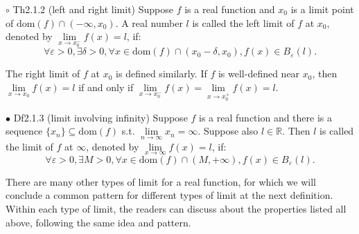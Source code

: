 \documentclass{article}
\begin{document}
\begin{Df}{$\circ$ Th2.1.2 (left and right limit)}
    Suppose $f$ is a real function and $x_0$ is a limit point of $\text{dom}(f)\cap (-\infty, x_0)$. A real number $l$ is called the left limit of $f$ at $x_0$, denoted by $\lim\limits_{x\rightarrow x_0^-}f(x) = l$, if:
    $$\forall\varepsilon>0, \exists\delta>0, \forall x\in\text{dom}(f)\cap(x_0-\delta, x_0), f(x)\in B_\varepsilon(l).$$
\end{Df}

\begin{Rmk}{}
    The right limit of $f$ at $x_0$ is defined similarly. \textcolor{Th}{If $f$ is well-defined near $x_0$, then $\lim\limits_{x\rightarrow x_0}f(x) = l$ if and only if $\lim\limits_{x\rightarrow x_0^-}f(x) = \lim\limits_{x\rightarrow x_0^+}f(x) = l$.}
\end{Rmk}

\begin{Df}{$\bullet$ Df2.1.3 (limit involving infinity)}
    Suppose $f$ is a real function and there is a sequence $\{x_n\}\subseteq\text{dom}(f)$ s.t. $\lim\limits_{n\rightarrow\infty}x_n = \infty$. Suppose also $l\in\mathbb{R}$. Then $l$ is called the limit of $f$ at $\infty$, denoted by $\lim\limits_{x\rightarrow\infty}f(x) = l$, if:
    $$\forall\varepsilon>0, \exists M>0, \forall x\in\text{dom}(f)\cap(M, +\infty), f(x)\in B_\varepsilon(l).$$
\end{Df}

\begin{Rmk}{}
    There are many other types of limit for a real function, for which we will conclude a common pattern for different types of limit at the next definition. Within each type of limit, the readers can discuss about the properties listed all above, following the same idea and pattern. 
\end{Rmk}
\end{document}
